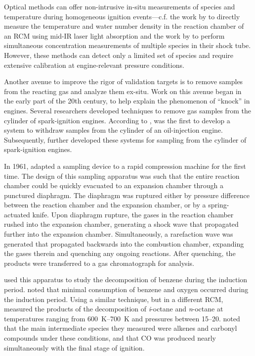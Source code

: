 \documentclass[../main.tex]{subfiles}
\begin{document}
Optical methods can offer non-intrusive in-situ measurements of species
and temperature during homogeneous ignition events---c.f. the work by
\textcite{Das2012, Uddi2012} to directly measure the temperature and
water number density in the reaction chamber of an RCM using mid-IR
laser light absorption and the work by \textcite{Stranic2013} to perform
simultaneous concentration measurements of multiple species in their
shock tube. However, these methods can detect only a limited set of
species and require extensive calibration at engine-relevant pressure
conditions.

Another avenue to improve the rigor of validation targets is to remove
samples from the reacting gas and analyze them ex-situ. Work on this
avenue began in the early part of the 20th century, to help explain the
phenomenon of ``knock'' in engines. Several researchers developed
techniques to remove gas samples from the cylinder of spark-ignition
engines. According to \textcite{Withrow1930}, \textcite{Brooks1922} was
the first to develop a system to withdraw samples from the cylinder of
an oil-injection engine. Subsequently, \textcite{Callendar1926,
Egerton1926, Lovell1927, Ricardo1928, Withrow1930, Steele1933, Egerton1935,
Downs1951, Pahnke1954} further developed these systems for sampling from
the cylinder of spark-ignition engines.

In 1961, \textcite{Roblee1961} adapted a sampling device to a rapid
compression machine for the first time. The design of this sampling
apparatus was such that the entire reaction chamber could be quickly
evacuated to an expansion chamber through a punctured diaphragm. The
diaphragm was ruptured either by pressure difference between the
reaction chamber and the expansion chamber, or by a spring-actuated
knife. Upon diaphragm rupture, the gases in the reaction chamber rushed
into the expansion chamber, generating a shock wave that propagated
further into the expansion chamber. Simultaneously, a rarefaction wave
was generated that propagated backwards into the combustion chamber,
expanding the gases therein and quenching any ongoing reactions. After
quenching, the products were transferred to a gas chromatograph for
analysis.

\textcite{Roblee1961} used this apparatus to study the decomposition of
benzene during the induction period. \textcite{Roblee1961} noted that minimal
consumption of benzene and oxygen occurred during the induction period.
Using a similar technique, but in a different RCM, \textcite{Martinengo1965}
measured the products of the decomposition of \textit{i}-octane and
\textit{n}-octane at temperatures ranging from \SIrange{600}{700}{\kelvin}
and pressures between \SIrange{15}{20}{\atmosphere}. \textcite{Martinengo1965}
noted that the main intermediate species they measured were alkenes and carbonyl
compounds under these conditions, and that CO was produced nearly simultaneously
with the final stage of ignition.
\end{document}
